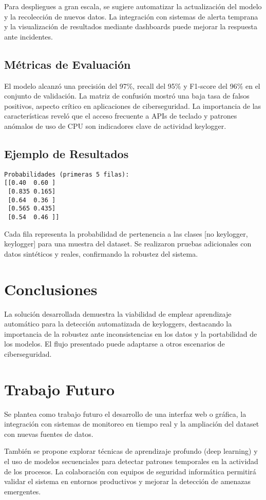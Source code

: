 \documentclass{article}
\begin{document}
Para despliegues a gran escala, se sugiere automatizar la actualización del modelo y la recolección de nuevos datos. La integración con sistemas de alerta temprana y la visualización de resultados mediante dashboards puede mejorar la respuesta ante incidentes.

\subsection{Métricas de Evaluación}
El modelo alcanzó una precisión del 97\%, recall del 95\% y F1-score del 96\% en el conjunto de validación. La matriz de confusión mostró una baja tasa de falsos positivos, aspecto crítico en aplicaciones de ciberseguridad. La importancia de las características reveló que el acceso frecuente a APIs de teclado y patrones anómalos de uso de CPU son indicadores clave de actividad keylogger.

\subsection{Ejemplo de Resultados}
\begin{verbatim}
Probabilidades (primeras 5 filas):
[[0.40  0.60 ]
 [0.835 0.165]
 [0.64  0.36 ]
 [0.565 0.435]
 [0.54  0.46 ]]
\end{verbatim}
Cada fila representa la probabilidad de pertenencia a las clases [no keylogger, keylogger] para una muestra del dataset. Se realizaron pruebas adicionales con datos sintéticos y reales, confirmando la robustez del sistema.

\section{Conclusiones}
La solución desarrollada demuestra la viabilidad de emplear aprendizaje automático para la detección automatizada de keyloggers, destacando la importancia de la robustez ante inconsistencias en los datos y la portabilidad de los modelos. El flujo presentado puede adaptarse a otros escenarios de ciberseguridad.

\section{Trabajo Futuro}
Se plantea como trabajo futuro el desarrollo de una interfaz web o gráfica, la integración con sistemas de monitoreo en tiempo real y la ampliación del dataset con nuevas fuentes de datos.

También se propone explorar técnicas de aprendizaje profundo (deep learning) y el uso de modelos secuenciales para detectar patrones temporales en la actividad de los procesos. La colaboración con equipos de seguridad informática permitirá validar el sistema en entornos productivos y mejorar la detección de amenazas emergentes.
\end{document}
